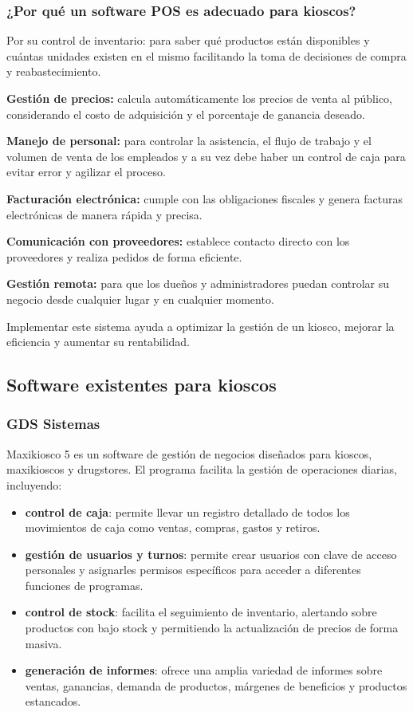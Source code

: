\documentclass[twoside]{article}
\begin{document}
\subsubsection{¿Por qué un software POS es adecuado para kioscos?}
Por su control de inventario: para saber qué productos están disponibles y cuántas unidades existen en el mismo facilitando la toma de decisiones de compra y reabastecimiento.\par
\textbf{Gestión de precios:} calcula automáticamente los precios de venta al público, considerando el costo de adquisición y el porcentaje de ganancia deseado. \par
\textbf{Manejo de personal:} para controlar la asistencia, el flujo de trabajo y el volumen de venta de los empleados y a su vez debe haber un control de caja para evitar error y agilizar el proceso.\par
\textbf{Facturación electrónica: }cumple con las obligaciones fiscales y genera facturas electrónicas de manera rápida y precisa.\par
\textbf{Comunicación con proveedores:} establece contacto directo con los proveedores y realiza pedidos de forma eficiente.\par
\textbf{Gestión remota: }para que los dueños y administradores puedan controlar su negocio desde cualquier lugar y en cualquier momento.\par

Implementar este sistema ayuda a optimizar la gestión de un kiosco, mejorar la eficiencia y aumentar su rentabilidad.\cite{bamboosoftCulMejor}

\subsection{Software existentes para kioscos}
\subsubsection{GDS Sistemas}
Maxikiosco 5 es un software de gestión de negocios diseñados para kioscos, maxikioscos y drugstores. El programa facilita la gestión de operaciones diarias, incluyendo: \cite{gdssistemasSoftwarePara}
\begin{itemize}
	\item \textbf{control de caja}: permite llevar un registro detallado de todos los movimientos de caja como ventas, compras, gastos y retiros.
	\item \textbf{gestión de usuarios y turnos}: permite crear usuarios con clave de acceso personales y asignarles permisos específicos para acceder a diferentes funciones de programas.
	\item \textbf{control de stock}: facilita el seguimiento de inventario, alertando sobre productos con bajo stock y permitiendo la actualización de precios de forma masiva.
	\item \textbf{generación de informes}: ofrece una amplia variedad de informes sobre ventas, ganancias, demanda de productos, márgenes de beneficios y productos estancados.
\end{itemize}
\end{document}

